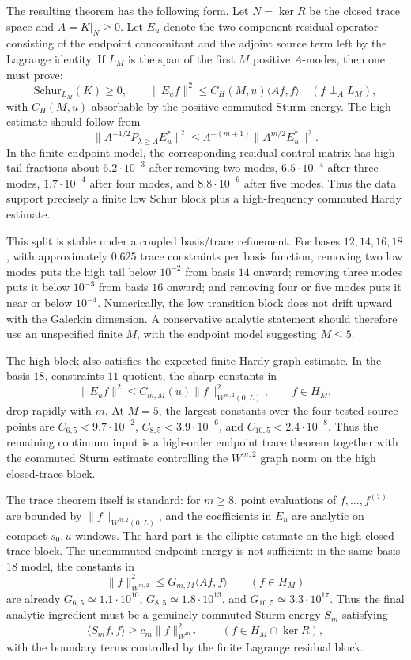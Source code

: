 \documentclass[11pt]{article}
\begin{document}
The resulting theorem has the following form.  Let \(N=\ker R\) be the closed
trace space and \(A=K|_N\ge0\).  Let \(E_u\) denote the two-component residual
operator consisting of the endpoint concomitant and the adjoint source term
left by the Lagrange identity.  If \(L_M\) is the span of the first \(M\)
positive \(A\)-modes, then one must prove:
\[
  \text{Schur}_{L_M}(K)\ge0,
  \qquad
  \|E_u f\|^2\le C_H(M,u)\langle Af,f\rangle
  \quad(f\perp_A L_M),
\]
with \(C_H(M,u)\) absorbable by the positive commuted Sturm energy.  The high
estimate should follow from
\[
  \|A^{-1/2}P_{\lambda\ge\Lambda}E_u^*\|^2
  \le
  \Lambda^{-(m+1)}\|A^{m/2}E_u^*\|^2 .
\]
In the finite endpoint model, the corresponding residual control matrix has
high-tail fractions about \(6.2\cdot10^{-3}\) after removing two modes,
\(6.5\cdot10^{-4}\) after three modes, \(1.7\cdot10^{-4}\) after four modes,
and \(8.8\cdot10^{-6}\) after five modes.  Thus the data support precisely a
finite low Schur block plus a high-frequency commuted Hardy estimate.

This split is stable under a coupled basis/trace refinement.  For bases
\(12,14,16,18\), with approximately \(0.625\) trace constraints per basis
function, removing two low modes puts the high tail below \(10^{-2}\) from
basis \(14\) onward; removing three modes puts it below \(10^{-3}\) from basis
\(16\) onward; and removing four or five modes puts it near or below
\(10^{-4}\).  Numerically, the low transition block does not drift upward with
the Galerkin dimension.  A conservative analytic statement should therefore
use an unspecified finite \(M\), with the endpoint model suggesting \(M\le5\).

The high block also satisfies the expected finite Hardy graph estimate.  In the
basis \(18\), constraints \(11\) quotient, the sharp constants in
\[
  \|E_u f\|^2\le C_{m,M}(u)\|f\|_{W^{m,2}(0,L)}^2,
  \qquad f\in H_M,
\]
drop rapidly with \(m\).  At \(M=5\), the largest constants over the four tested
source points are \(C_{6,5}<9.7\cdot10^{-2}\),
\(C_{8,5}<3.9\cdot10^{-6}\), and \(C_{10,5}<2.4\cdot10^{-8}\).  Thus the
remaining continuum input is a high-order endpoint trace theorem together with
the commuted Sturm estimate controlling the \(W^{m,2}\) graph norm on the high
closed-trace block.

The trace theorem itself is standard: for \(m\ge8\), point evaluations of
\(f,\ldots,f^{(7)}\) are bounded by \(\|f\|_{W^{m,2}(0,L)}\), and the
coefficients in \(E_u\) are analytic on compact \(s_0,u\)-windows.  The hard
part is the elliptic estimate on the high closed-trace block.  The uncommuted
endpoint energy is not sufficient: in the same basis \(18\) model, the
constants in
\[
  \|f\|_{W^{m,2}}^2\le G_{m,M}\langle Af,f\rangle
  \qquad(f\in H_M)
\]
are already \(G_{6,5}\simeq 1.1\cdot10^{10}\),
\(G_{8,5}\simeq 1.8\cdot10^{13}\), and
\(G_{10,5}\simeq 3.3\cdot10^{17}\).  Thus the final analytic ingredient must
be a genuinely commuted Sturm energy \(S_m\) satisfying
\[
  \langle S_m f,f\rangle \ge c_m\|f\|_{W^{m,2}}^2
  \qquad (f\in H_M\cap\ker R),
\]
with the boundary terms controlled by the finite Lagrange residual block.
\end{document}

